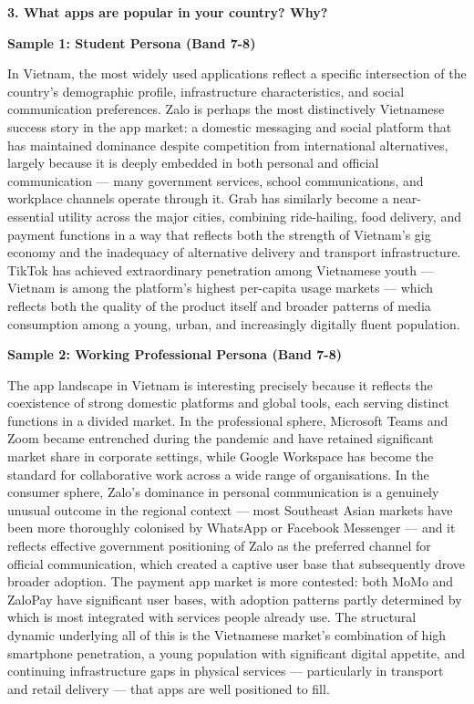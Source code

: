 \separator

\begin{ieltsquestion}
\textbf{3. What apps are popular in your country? Why?}
\end{ieltsquestion}
\textbf{Sample 1: Student Persona (Band 7-8)}

In Vietnam, the most widely used applications reflect a specific intersection of the country's demographic profile, infrastructure characteristics, and social communication preferences. Zalo is perhaps the most distinctively Vietnamese success story in the app market: a domestic messaging and social platform that has maintained dominance despite competition from international alternatives, largely because it is deeply embedded in both personal and official communication — many government services, school communications, and workplace channels operate through it. Grab has similarly become a near-essential utility across the major cities, combining ride-hailing, food delivery, and payment functions in a way that reflects both the strength of Vietnam's gig economy and the inadequacy of alternative delivery and transport infrastructure. TikTok has achieved extraordinary penetration among Vietnamese youth — Vietnam is among the platform's highest per-capita usage markets — which reflects both the quality of the product itself and broader patterns of media consumption among a young, urban, and increasingly digitally fluent population.

\textbf{Sample 2: Working Professional Persona (Band 7-8)}

The app landscape in Vietnam is interesting precisely because it reflects the coexistence of strong domestic platforms and global tools, each serving distinct functions in a divided market. In the professional sphere, Microsoft Teams and Zoom became entrenched during the pandemic and have retained significant market share in corporate settings, while Google Workspace has become the standard for collaborative work across a wide range of organisations. In the consumer sphere, Zalo's dominance in personal communication is a genuinely unusual outcome in the regional context — most Southeast Asian markets have been more thoroughly colonised by WhatsApp or Facebook Messenger — and it reflects effective government positioning of Zalo as the preferred channel for official communication, which created a captive user base that subsequently drove broader adoption. The payment app market is more contested: both MoMo and ZaloPay have significant user bases, with adoption patterns partly determined by which is most integrated with services people already use. The structural dynamic underlying all of this is the Vietnamese market's combination of high smartphone penetration, a young population with significant digital appetite, and continuing infrastructure gaps in physical services — particularly in transport and retail delivery — that apps are well positioned to fill.

